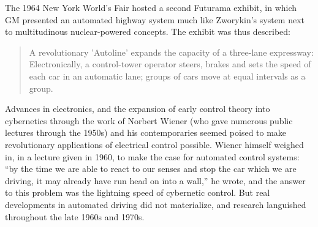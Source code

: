 The 1964 New York World's Fair hosted a second Futurama exhibit, in
which GM presented an automated highway system much like Zworykin's
system next to multitudinous nuclear-powered concepts. The exhibit was
thus described: 
\begin{quote}
A revolutionary 'Autoline' expands the capacity of a three-lane
expressway: Electronically, a control-tower operator steers, brakes
and sets the speed of each car in an automatic lane; groups of cars
move at equal intervals as a group.\cite{???}
\end{quote}
 Advances in
electronics, and the expansion of early control theory into
cybernetics through the work of Norbert Wiener (who gave numerous
public lectures through the 1950s) and his contemporaries seemed
poised to make revolutionary applications of electrical control
possible. Wiener himself weighed in, in a lecture given in 1960, to
make the case for automated control systems: ``by the time we are able
to react to our senses and stop the car which we are driving, it may
already have run head on into a wall,'' he wrote, and the answer to
this problem was the lightning speed of cybernetic control.\cite{???} But real
developments in automated driving did not materialize, and research
languished throughout the late 1960s and 1970s.\cite{???}


